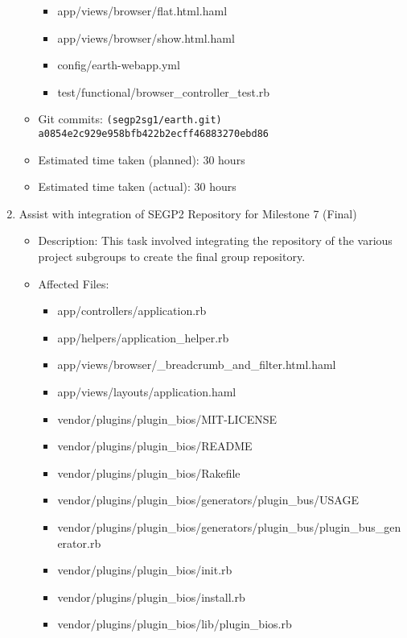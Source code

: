 \documentclass{article}
\begin{document}
\begin{enumerate}
\begin{itemize}
\begin{itemize}
                    \item app/views/browser/flat.html.haml
                    \item app/views/browser/show.html.haml
                    \item config/earth-webapp.yml
                    \item test/functional/browser\_controller\_test.rb
                \end{itemize}
            \item Git commits: \texttt{(segp2sg1/earth.git) a0854e2c929e958bfb422b2ecff46883270ebd86}
            \item Estimated time taken (planned): 30 hours
            \item Estimated time taken (actual): 30 hours
        \end{itemize}
    \item Assist with integration of SEGP2 Repository for Milestone 7 (Final)
        \begin{itemize}
            \item Description: This task involved integrating the repository of the various project subgroups to create the final group repository.
            \item Affected Files:
                \begin{itemize}
                    \item app/controllers/application.rb
                    \item app/helpers/application\_helper.rb
                    \item app/views/browser/\_breadcrumb\_and\_filter.html.haml
                    \item app/views/layouts/application.haml
                    \item vendor/plugins/plugin\_bios/MIT-LICENSE
                    \item vendor/plugins/plugin\_bios/README
                    \item vendor/plugins/plugin\_bios/Rakefile
                    \item vendor/plugins/plugin\_bios/generators/plugin\_bus/USAGE
                    \item vendor/plugins/plugin\_bios/generators/plugin\_bus/plugin\_bus\_generator.rb
                    \item vendor/plugins/plugin\_bios/init.rb
                    \item vendor/plugins/plugin\_bios/install.rb
                    \item vendor/plugins/plugin\_bios/lib/plugin\_bios.rb

\end{itemize}
\end{itemize}
\end{enumerate}
\end{document}
